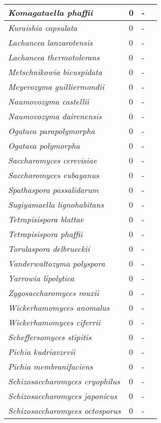 {\begin{longtable}{| L{4cm} | L{2cm}  | L{5cm} | L{4cm} |}
\textit{Komagataella phaffii} & 0 & - & \\ \hline
\textit{Kuraishia capsulata} & 0 & - & \\ \hline
\textit{Lachancea lanzarotensis} & 0 & - & \\ \hline
\textit{Lachancea thermotolerans} & 0 & - & \\ \hline
\textit{Metschnikowia bicuspidata} & 0 & - & \\ \hline
\textit{Meyerozyma guilliermondii} & 0 & - & \\ \hline
\textit{Naumovozyma castellii} & 0 & - & \\ \hline
\textit{Naumovozyma dairenensis} & 0 & - & \\ \hline
\textit{Ogataea parapolymorpha} & 0 & - & \\ \hline
\textit{Ogataea polymorpha} & 0 & - & \\ \hline
\textit{Saccharomyces cerevisiae} & 0 & - & \\ \hline
\textit{Saccharomyces eubayanus} & 0 & - & \\ \hline
\textit{Spathaspora passalidarum} & 0 & - & \\ \hline
\textit{Sugiyamaella lignohabitans} & 0 & - & \\ \hline
\textit{Tetrapisispora blattae} & 0 & - & \\ \hline
\textit{Tetrapisispora phaffii} & 0 & - & \\ \hline
\textit{Torulaspora delbrueckii} & 0 & - & \\ \hline
\textit{Vanderwaltozyma polyspora} & 0 & - & \\ \hline
\textit{Yarrowia lipolytica} & 0 & - & \\ \hline
\textit{Zygosaccharomyces rouxii} & 0 & - & \\ \hline
\textit{Wickerhamomyces anomalus} & 0 & - & \\ \hline
\textit{Wickerhamomyces ciferrii} & 0 & - & \\ \hline
\textit{Scheffersomyces stipitis} & 0 & - & \\ \hline
\textit{Pichia kudriavzevii} & 0 & - & \\ \hline
\textit{Pichia membranifaciens} & 0 & - & \\ \hline
\textit{Schizosaccharomyces cryophilus} & 0 & - & \\ \hline
\textit{Schizosaccharomyces japonicus} & 0 & - & \\ \hline
\textit{Schizosaccharomyces octosporus} & 0 & - & \\ \hline

\end{longtable}}
